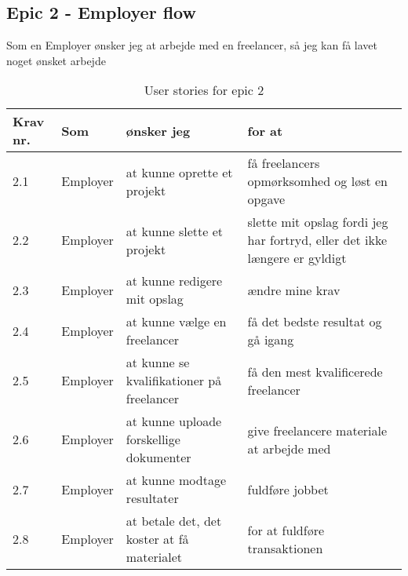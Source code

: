 \subsection{Epic 2 - Employer flow}

Som en Employer ønsker jeg at arbejde med en freelancer, så jeg kan få lavet noget ønsket arbejde

\begin{table}[H]
    \centering
    \caption{User stories for epic 2}
    \label{tab:us-epic2}
    \begin{tabular}{p{1cm}|p{2cm}|p{6cm}|p{6cm}}
        \textbf{Krav nr.} & \textbf{Som} & \textbf{ønsker jeg}                        & \textbf{for at}                                                                                     \\
        \hline
        2.1               & Employer     & at kunne oprette et projekt                & få freelancers opmørksomhed og løst en opgave                                                       \\
        \hline
        2.2               & Employer     & at kunne slette et projekt                 & \multicolumn{1}{p{6cm}}{slette mit opslag fordi jeg har fortryd, eller det ikke længere er gyldigt} \\
        \hline
        2.3               & Employer     & at kunne redigere mit opslag               & ændre mine krav                                                                                     \\
        \hline
        2.4               & Employer     & at kunne vælge en freelancer               & få det bedste resultat og gå igang                                                                  \\
        \hline
        2.5               & Employer     & at kunne se kvalifikationer på freelancer  & få den mest kvalificerede freelancer                                                                \\
        \hline
        2.6               & Employer     & at kunne uploade forskellige dokumenter    & give freelancere materiale at arbejde med                                                           \\
        \hline
        2.7               & Employer     & at kunne modtage resultater                & fuldføre jobbet                                                                                     \\
        \hline
        2.8               & Employer     & at betale det, det koster at få materialet & for at fuldføre transaktionen                                                                       \\
    \end{tabular}
\end{table}

